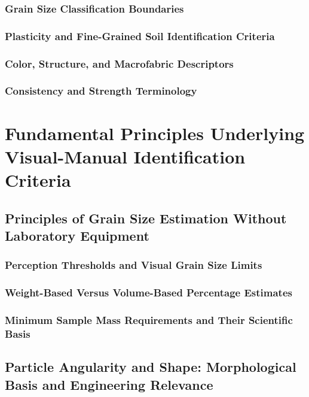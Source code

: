\subsubsection{Grain Size Classification Boundaries}

\subsubsection{Plasticity and Fine-Grained Soil Identification Criteria}

\subsubsection{Color, Structure, and Macrofabric Descriptors}

\subsubsection{Consistency and Strength Terminology}

\section{Fundamental Principles Underlying Visual-Manual Identification Criteria}

\subsection{Principles of Grain Size Estimation Without Laboratory Equipment}

\subsubsection{Perception Thresholds and Visual Grain Size Limits}

\subsubsection{Weight-Based Versus Volume-Based Percentage Estimates}

\subsubsection{Minimum Sample Mass Requirements and Their Scientific Basis}

\subsection{Particle Angularity and Shape: Morphological Basis and Engineering Relevance}


